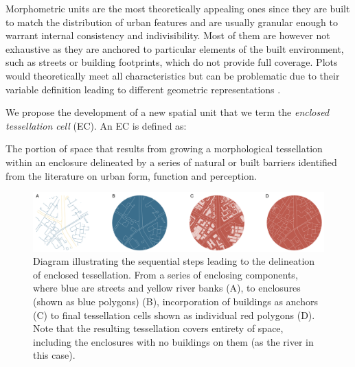 %
Morphometric units are the most theoretically appealing ones since they are built to
match the distribution of urban features and are usually granular enough to
warrant internal consistency and indivisibility. Most of them are however not
exhaustive as they are anchored to particular elements of the built environment,
such as streets or building footprints, which do not provide full coverage.
Plots would theoretically meet all characteristics but can be problematic due to
their variable definition leading to different geometric representations
\citep{kropf2018plots}.

We propose the development of a new spatial unit that we term the
\textit{enclosed tessellation cell} (EC).
An EC is defined as:
\begin{theorem}
        The portion of space that results from growing a morphological
tessellation within an enclosure delineated by a series of natural or built
barriers identified from the literature on urban form, function and perception.
\end{theorem}

\begin{figure}
\includegraphics[width=\linewidth]{figures/et_diagram.pdf}
\caption{Diagram illustrating the sequential steps leading to the delineation of
enclosed tessellation. From a series of enclosing components, where blue are streets and
yellow river banks (A), to enclosures (shown as blue polygons) (B),
incorporation of buildings as anchors (C) to final tessellation cells shown as individual red polygons (D).
Note that the resulting tessellation covers entirety of space, including the enclosures with no buildings on them (as the river in this case).}
\label{fig:et_diagram}
\end{figure}

